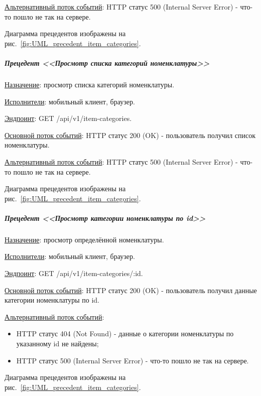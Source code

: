 \underline{Альтернативный поток событий}:
HTTP статус 500 (Internal Server Error) - что-то пошло не так на сервере.

Диаграмма прецедентов изображены на рис.~\ref{fig:UML_precedent_item_categories}.


\subparagraph{Прецедент <<Просмотр списка категорий номенклатуры>>} \hspace{0pt}

\underline{Назначение}: просмотр списка категорий номенклатуры.

\underline{Исполнители}: мобильный клиент, браузер.

\underline{Эндпоинт}: GET /api/v1/item-categories.


\underline{Основной поток событий}: HTTP статус 200 (OK) - пользователь получил список номенклатуры. 

\underline{Альтернативный поток событий}:
HTTP статус 500 (Internal Server Error) - что-то пошло не так на сервере.

Диаграмма прецедентов изображены на рис.~\ref{fig:UML_precedent_item_categories}.


\subparagraph{Прецедент <<Просмотр категории номенклатуры по id>>} \hspace{0pt}

\underline{Назначение}: просмотр определённой номенклатуры.

\underline{Исполнители}: мобильный клиент, браузер.

\underline{Эндпоинт}: GET /api/v1/item-categories/:id.


\underline{Основной поток событий}: HTTP статус 200 (OK) - пользователь получил данные категории номенклатуры по id. 

\underline{Альтернативный поток событий}:

\begin{itemize}
    \item HTTP статус 404 (Not Found) - данные о категории номенклатуры по указанному id не найдены;
    \item HTTP статус 500 (Internal Server Error) - что-то пошло не так на сервере.
\end{itemize}

Диаграмма прецедентов изображены на рис.~\ref{fig:UML_precedent_item_categories}.


